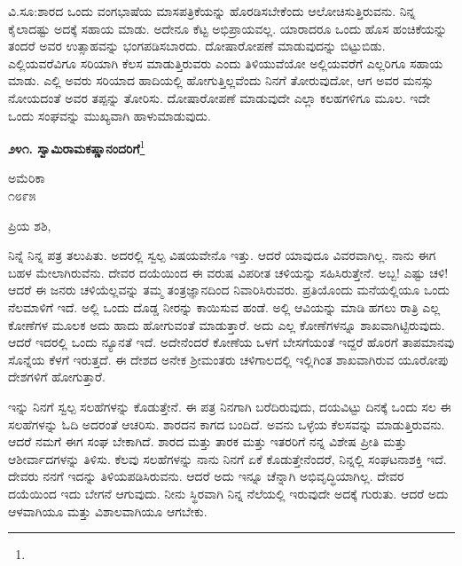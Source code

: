 ವಿ.ಸೂ:\enginline{-}ಶಾರದ ಒಂದು ವಂಗಭಾಷೆಯ ಮಾಸಪತ್ರಿಕೆಯನ್ನು ಹೊರಡಿಸಬೇಕೆಂದು ಆಲೋಚಿಸುತ್ತಿರುವನು. ನಿನ್ನ ಕೈಲಾದಷ್ಟು ಅದಕ್ಕೆ ಸಹಾಯ ಮಾಡು. ಅದೇನೂ ಕೆಟ್ಟ ಅಭಿಪ್ರಾಯವಲ್ಲ. ಯಾರಾದರೂ ಒಂದು ಹೊಸ ಹಂಚಿಕೆಯನ್ನು ತಂದರೆ ಅವರ ಉತ್ಸಾಹವನ್ನು ಭಂಗಪಡಿಸಬಾರದು. ದೋಷಾರೋಪಣೆ ಮಾಡುವುದನ್ನು ಬಿಟ್ಟುಬಿಡು. ಎಲ್ಲಿಯವರೆವಿಗೂ ಸರಿಯಾಗಿ ಕೆಲಸ ಮಾಡುತ್ತಿರುವರು ಎಂದು ತಿಳಿಯುವೆಯೋ ಅಲ್ಲಿಯವರೆಗೆ ಎಲ್ಲರಿಗೂ ಸಹಾಯ ಮಾಡು. ಎಲ್ಲಿ ಅವರು ಸರಿಯಾದ ಹಾದಿಯಲ್ಲಿ ಹೋಗುತ್ತಿಲ್ಲವೆಂದು ನಿನಗೆ ತೋರುವುದೋ, ಆಗ ಅವರ ಮನಸ್ಸು ನೋಯದಂತೆ ಅವರ ತಪ್ಪನ್ನು ತೋರಿಸು. ದೋಷಾರೋಪಣೆ ಮಾಡುವುದೇ ಎಲ್ಲಾ ಕಲಹಗಳಿಗೂ ಮೂಲ. ಇದೇ ಒಂದು ಸಂಘವನ್ನು ಮುಖ್ಯವಾಗಿ ಹಾಳುಮಾಡುವುದು.

\begin{center}
\textbf{೨೪೧. ಸ್ವಾಮಿರಾಮಕಷ್ಣಾನಂದರಿಗೆ}\footnote{}
\end{center}

\vspace{-0.5cm}

\begin{flushright}
ಅಮೆರಿಕಾ\\೧೮೯೫
\end{flushright}

\vspace{-0.3cm}

\noindent
ಪ್ರಿಯ ಶಶಿ,

ನಿನ್ನೆ ನಿನ್ನ ಪತ್ರ ತಲುಪಿತು. ಅದರಲ್ಲಿ ಸ್ವಲ್ಪ ವಿಷಯವೇನೊ ಇತ್ತು. ಆದರೆ ಯಾವುದೂ ವಿವರವಾಗಿಲ್ಲ. ನಾನು ಈಗ ಬಹಳ ಮೇಲಾಗಿರುವೆನು. ದೇವರ ದಯೆಯಿಂದ ಈ ವರುಷ ವಿಪರೀತ ಚಳಿಯನ್ನು ಸಹಿಸಿರುತ್ತೇನೆ. ಅಬ್ಬ! ಎಷ್ಟು ಚಳಿ! ಆದರೆ ಈ ಜನರು ಚಳಿಯೆಲ್ಲವನ್ನು ತಮ್ಮ ತಂತ್ರಜ್ಞಾನದಿಂದ ನಿವಾರಿಸಿರುವರು. ಪ್ರತಿಯೊಂದು ಮನೆಯಲ್ಲಿಯೂ ಒಂದು ನೆಲಮಾಳಿಗೆ ಇದೆ. ಅಲ್ಲಿ ಒಂದು ದೊಡ್ಡ ನೀರನ್ನು ಕಾಯಿಸುವ ಹಂಡೆ. ಅಲ್ಲಿ ಆವಿಯನ್ನು ಮಾಡಿ ಹಗಲು ರಾತ್ರಿ ಎಲ್ಲ ಕೋಣೆಗಳ ಮೂಲಕ ಅದು ಹಾದು ಹೋಗುವಂತೆ ಮಾಡುತ್ತಾರೆ. ಅದು ಎಲ್ಲ ಕೋಣೆಗಳನ್ನೂ ಶಾಖವಾಗಿಟ್ಟಿರುವುದು. ಆದರೆ ಇದರಲ್ಲಿ ಒಂದು ನ್ಯೂನತೆ ಇದೆ. ಅದೇನೆಂದರೆ ಕೋಣೆಯ ಒಳಗೆ ಬೇಸಗೆಯಂತೆ ಇದ್ದರೆ ಹೊರಗೆ ತಾಪಮಾನವು ಸೊನ್ನೆಯ ಕೆಳಗೆ ಇರುತ್ತದೆ. ಈ ದೇಶದ ಅನೇಕ ಶ‍್ರೀಮಂತರು ಚಳಿಗಾಲದಲ್ಲಿ ಇಲ್ಲಿಗಿಂತ ಶಾಖವಾಗಿರುವ ಯೂರೋಪು ದೇಶಗಳಿಗೆ ಹೋಗುತ್ತಾರೆ.

ಇನ್ನು ನಿನಗೆ ಸ್ವಲ್ಪ ಸಲಹೆಗಳನ್ನು ಕೊಡುತ್ತೇನೆ. ಈ ಪತ್ರ ನಿನಗಾಗಿ ಬರೆದಿರುವುದು, ದಯವಿಟ್ಟು ದಿನಕ್ಕೆ ಒಂದು ಸಲ ಈ ಸಲಹೆಗಳನ್ನು ಓದಿ ಅದರಂತೆ ಆಚರಿಸು. ಶಾರದನ ಕಾಗದ ಬಂದಿದೆ. ಅವನು ಒಳ್ಳೆಯ ಕೆಲಸವನ್ನು ಮಾಡುತ್ತಿರುವನು. ಆದರೆ ನಮಗೆ ಈಗ ಸಂಘ ಬೇಕಾಗಿದೆ. ಶಾರದ ಮತ್ತು ತಾರಕ ಮತ್ತು ಇತರರಿಗೆ ನನ್ನ ವಿಶೇಷ ಪ್ರೀತಿ ಮತ್ತು ಆಶೀರ್ವಾದಗಳನ್ನು ತಿಳಿಸು. ಕೆಲವು ಸಲಹೆಗಳನ್ನು ನಾನು ನಿನಗೆ ಏಕೆ ಕೊಡುತ್ತೇನೆಂದರೆ, ನಿನ್ನಲ್ಲಿ ಸಂಘಟನಾಶಕ್ತಿ ಇದೆ. ದೇವರು ನನಗೆ ಇದನ್ನು ತಿಳಿಯಪಡಿಸಿರುವನು. ಆದರೆ ಅದು ಇನ್ನೂ ಚೆನ್ನಾಗಿ ಅಭಿವೃದ್ಧಿಯಾಗಿಲ್ಲ. ದೇವರ ದಯೆಯಿಂದ ಇದು ಬೇಗನೆ ಆಗುವುದು. ನೀನು ಸ್ಥಿರವಾಗಿ ನಿನ್ನ ನೆಲೆಯಲ್ಲಿ ಇರುವುದೇ ಅದಕ್ಕೆ ಗುರುತು. ಆದರೆ ಅದು ಆಳವಾಗಿಯೂ ಮತ್ತು ವಿಶಾಲವಾಗಿಯೂ ಆಗಬೇಕು.

\vspace{0.1cm}

